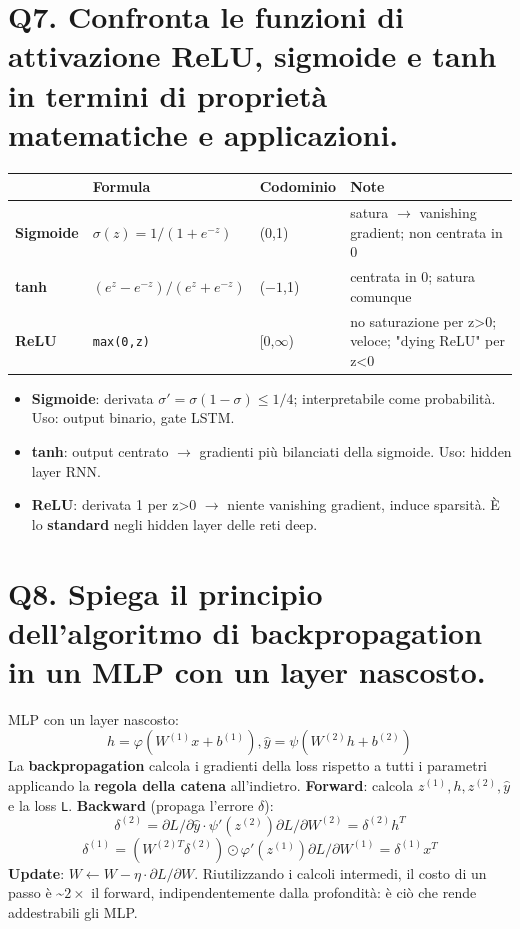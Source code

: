 \documentclass[11pt,a4paper]{article}
\begin{document}
\section*{Q7. Confronta le funzioni di attivazione ReLU, sigmoide e tanh in termini di proprietà matematiche e applicazioni.}
\begin{center}\renewcommand{\arraystretch}{1.25}
\begin{tabular}{|l|l|l|l|}\hline
\textbf{} & \textbf{Formula} & \textbf{Codominio} & \textbf{Note} \\ \hline
\textbf{Sigmoide} & $\sigma (z)=1/(1+e^{-z})$ & (0,1) & satura $\to $ vanishing gradient; non centrata in 0 \\ \hline
\textbf{tanh} & $(e^{z}-e^{-z})/(e^{z}+e^{-z})$ & ($-1$,1) & centrata in 0; satura comunque \\ \hline
\textbf{ReLU} & \texttt{max(0,z)} & [0,$\infty $) & no saturazione per z>0; veloce; "dying ReLU" per z<0 \\ \hline
\end{tabular}\end{center}
\begin{itemize}
\item \textbf{Sigmoide}: derivata $\sigma '=\sigma (1-\sigma ) \le  1/4$; interpretabile come probabilità. Uso: output binario, gate LSTM.
\item \textbf{tanh}: output centrato $\to $ gradienti più bilanciati della sigmoide. Uso: hidden layer RNN.
\item \textbf{ReLU}: derivata 1 per z>0 $\to $ niente vanishing gradient, induce sparsità. È lo \textbf{standard} negli hidden layer delle reti deep.
\end{itemize}
\newpage
\section*{Q8. Spiega il principio dell'algoritmo di backpropagation in un MLP con un layer nascosto.}
MLP con un layer nascosto:
\[ h = \varphi (W^{(1)}x + b^{(1)}),   \hat{y} = \psi (W^{(2)}h + b^{(2)}) \]
La \textbf{backpropagation} calcola i gradienti della loss rispetto a tutti i parametri applicando la \textbf{regola della catena} all'indietro.
\textbf{Forward}: calcola $z^{(1)}, h, z^{(2)}, \hat{y}$ e la loss \texttt{L}.
\textbf{Backward} (propaga l'errore $\delta $):
\[ \delta ^{(2)} = \partial L/\partial \hat{y} \cdot  \psi '(z^{(2)})              \partial L/\partial W^{(2)} = \delta ^{(2)} h^{T} \]
\[ \delta ^{(1)} = (W^{(2)T} \delta ^{(2)}) \odot  \varphi '(z^{(1)})      \partial L/\partial W^{(1)} = \delta ^{(1)} x^{T} \]
\textbf{Update}: $W \leftarrow  W - \eta  \cdot  \partial L/\partial W$.
Riutilizzando i calcoli intermedi, il costo di un passo è \textasciitilde{}$2\times $ il forward, indipendentemente dalla profondità: è ciò che rende addestrabili gli MLP.
\newpage
\end{document}
